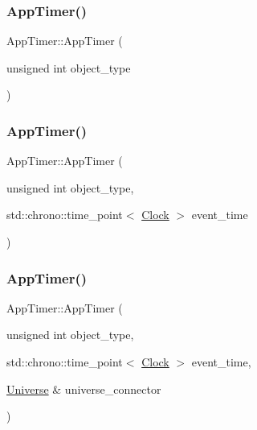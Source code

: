 \subsubsection{\texorpdfstring{App\+Timer()}{AppTimer()}\hspace{0.1cm}{\footnotesize\ttfamily [2/4]}}
{\footnotesize\ttfamily App\+Timer\+::\+App\+Timer (\begin{DoxyParamCaption}\item[{unsigned int}]{object\+\_\+type }\end{DoxyParamCaption})\hspace{0.3cm}{\ttfamily [inline]}}

\mbox{\label{classAppTimer_a192075895ca575e9acb2663f3ebcecd6}} 
\subsubsection{\texorpdfstring{App\+Timer()}{AppTimer()}\hspace{0.1cm}{\footnotesize\ttfamily [3/4]}}
{\footnotesize\ttfamily App\+Timer\+::\+App\+Timer (\begin{DoxyParamCaption}\item[{unsigned int}]{object\+\_\+type,  }\item[{std\+::chrono\+::time\+\_\+point$<$ \mbox{\hyperlink{universe_8h_a0ef8d951d1ca5ab3cfaf7ab4c7a6fd80}{Clock}} $>$}]{event\+\_\+time }\end{DoxyParamCaption})\hspace{0.3cm}{\ttfamily [inline]}}

\mbox{\label{classAppTimer_af0836d131aa78b6812930199a5c7f9bd}} 
\subsubsection{\texorpdfstring{App\+Timer()}{AppTimer()}\hspace{0.1cm}{\footnotesize\ttfamily [4/4]}}
{\footnotesize\ttfamily App\+Timer\+::\+App\+Timer (\begin{DoxyParamCaption}\item[{unsigned int}]{object\+\_\+type,  }\item[{std\+::chrono\+::time\+\_\+point$<$ \mbox{\hyperlink{universe_8h_a0ef8d951d1ca5ab3cfaf7ab4c7a6fd80}{Clock}} $>$}]{event\+\_\+time,  }\item[{\mbox{\hyperlink{classUniverse}{Universe}} \&}]{universe\+\_\+connector }\end{DoxyParamCaption})\hspace{0.3cm}{\ttfamily [inline]}}

